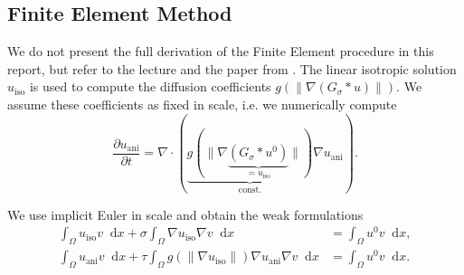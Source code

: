 \documentclass{report}
\renewcommand*\d{\mathop{}\!\mathrm{d}}
\def\iso{\text{iso}}
\def\ani{\text{ani}}
\begin{document}
\subsection{Finite Element Method} 

We do not present the full derivation of the Finite Element procedure in this report, but refer to the lecture and the paper from \cite{handlovicova2002}. The linear isotropic solution $u_\iso$ is used to compute the diffusion coefficients $g\left(\left\|\nabla (G_{\sigma} \ast u)\right\|\right)$. We assume these coefficients as fixed in scale, i.e. we numerically compute
\begin{equation}
	\frac{\partial u_\ani}{\partial t} = \nabla \cdot (\underbrace{g(\|\nabla \underbrace{(G_{\sigma} \ast u^0)}_{=u_\iso}\|)}_\text{const.} \nabla u_\ani).
\end{equation}

We use implicit Euler in scale and obtain the weak formulations
\begin{align}
	\int_\Omega u_\iso v \d x + \sigma \int_\Omega \nabla u_\iso \nabla v \d x &= \int_\Omega u^0 v \d x, \\
	\int_\Omega u_\ani v \d x + \tau \int_\Omega g(\|\nabla u_\iso\|) \nabla u_\ani \nabla v \d x &= \int_\Omega u^0 v \d x.
\end{align}
\end{document}
